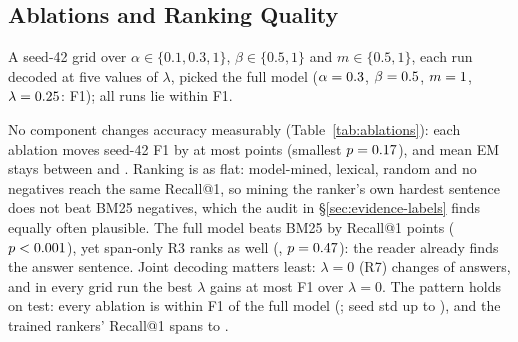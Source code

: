 

\subsection{Ablations and Ranking Quality}
\label{sec:ablations}

\begin{table}[t]
\centering
\small
\setlength{\tabcolsep}{5pt}

\caption{Ablations on validation (\ablNQuestions{} questions): mean (std) over seeds 13, 42 and 87.
$^{*}$: differs from R4 on seed 42 ($p<0.01$, paired randomisation test); no other row does. R3 has
no ranker: its Recall@1 ranks sentences by their best span.}
\label{tab:ablations}
\end{table}

A seed-42 grid over $\alpha\in\{0.1,0.3,1\}$, $\beta\in\{0.5,1\}$ and $m\in\{0.5,1\}$, each run
decoded at five values of $\lambda$, picked the full model ($\alpha=0.3$,
$\beta=0.5$, $m=1$, $\lambda=0.25$: \lamPickFOne{} F1); all \lamRuns{} runs
lie within \lamRunSpread{} F1.

No component changes accuracy measurably (Table~\ref{tab:ablations}): each ablation moves seed-42
F1 by at most \ablMaxAbsDeltaFOne{} points (smallest $p=0.17$), and mean EM stays between
\ablEmMin{} and \ablEmMax{}. Ranking is as flat: model-mined, lexical, random and no negatives reach
the same Recall@1, so mining the ranker's own hardest sentence does not beat BM25 negatives, which
the audit in \S\ref{sec:evidence-labels} finds equally often plausible. The full model beats BM25 by
\ablRoneDeltaROneAbs{} Recall@1 points ($p<0.001$), yet span-only R3 ranks as well
(\ablRthreeDeltaROne{}, $p=0.47$): the reader already finds the answer sentence. Joint
decoding matters least: $\lambda=0$ (R7) changes \ablRsevenChangedAnswers{} of \ablNQuestions{}
answers, and in every grid run the best $\lambda$ gains at most \lamMaxGain{} F1 over $\lambda=0$.
The pattern holds on test: every ablation is within \ablTestMaxAbsDiffFOne{} F1 of the full model
(\ablTestRfourFOne{}; seed std up to \ablTestMaxStdFOne{}), and the trained rankers' Recall@1 spans
\ablTestROneMin{} to \ablTestROneMax{}.
